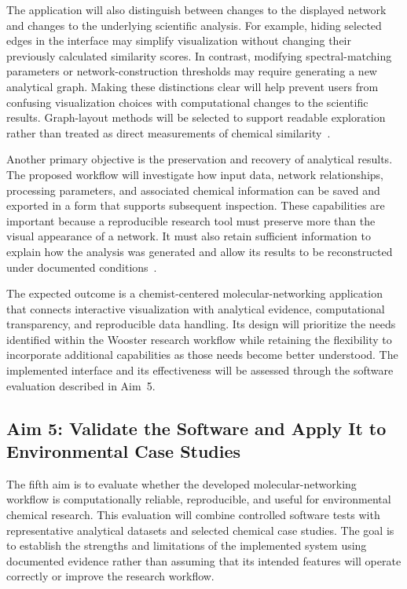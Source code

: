         The application will also distinguish between changes to the displayed network and changes to the underlying scientific analysis. For example, hiding selected edges in the interface may simplify visualization without changing their previously calculated similarity scores. In contrast, modifying spectral-matching parameters or network-construction thresholds may require generating a new analytical graph. Making these distinctions clear will help prevent users from confusing visualization choices with computational changes to the scientific results. Graph-layout methods will be selected to support readable exploration rather than treated as direct measurements of chemical similarity~\cite{Jacomy2014,Pienta2015}.

        Another primary objective is the preservation and recovery of analytical results. The proposed workflow will investigate how input data, network relationships, processing parameters, and associated chemical information can be saved and exported in a form that supports subsequent inspection. These capabilities are important because a reproducible research tool must preserve more than the visual appearance of a network. It must also retain sufficient information to explain how the analysis was generated and allow its results to be reconstructed under documented conditions~\cite{Wilson2017}.

        The expected outcome is a chemist-centered molecular-networking application that connects interactive visualization with analytical evidence, computational transparency, and reproducible data handling. Its design will prioritize the needs identified within the Wooster research workflow while retaining the flexibility to incorporate additional capabilities as those needs become better understood. The implemented interface and its effectiveness will be assessed through the software evaluation described in Aim~5.
        
    \subsection{Aim 5: Validate the Software and Apply It to Environmental Case Studies}\label{subsec:aim-five}

        The fifth aim is to evaluate whether the developed molecular-networking workflow is computationally reliable, reproducible, and useful for environmental chemical research. This evaluation will combine controlled software tests with representative analytical datasets and selected chemical case studies. The goal is to establish the strengths and limitations of the implemented system using documented evidence rather than assuming that its intended features will operate correctly or improve the research workflow.

